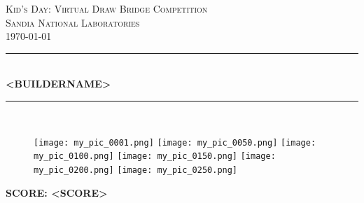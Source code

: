 \documentclass[12pt]{article}
\begin{document}

\newcommand{\HRule}{\rule{\linewidth}{0.5mm}} 

\newenvironment{passbox}{%
  \def\FrameCommand{\fboxsep=\FrameSep \fcolorbox{green}{white}}%
  \color{green}\MakeFramed {\FrameRestore}}%
 {\endMakeFramed}

\newenvironment{failbox}{%
  \def\FrameCommand{\fboxsep=\FrameSep \fcolorbox{red}{white}}%
  \color{red}\MakeFramed {\FrameRestore}}%
 {\endMakeFramed}

\center 
 

\textsc{\LARGE Kid's Day: Virtual Draw Bridge Competition}\\[1.5cm] 
\textsc{\Large Sandia National Laboratories}\\[0.5cm] 
\textsc{\Large \today}\\[0.5cm] 


\HRule \\[0.4cm]
{ \huge \bfseries <BUILDERNAME>}\\[0.4cm] 
\HRule \\[1.5cm]
 


\begin{figure}[h]
\centering
\texttt{[image: my\_pic\_0001.png]}
\texttt{[image: my\_pic\_0050.png]}
\texttt{[image: my\_pic\_0100.png]}
\texttt{[image: my\_pic\_0150.png]}
\texttt{[image: my\_pic\_0200.png]}
\texttt{[image: my\_pic\_0250.png]}
\end{figure}


{ \huge \bfseries SCORE: <SCORE>}\\[0.4cm] 
 
\end{document}
